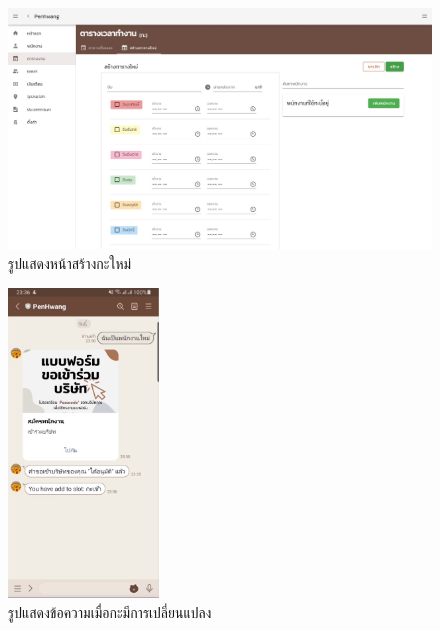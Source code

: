 \begin{figure}
  \begin{center}
    \includegraphics[width=14cm,keepaspectratio]{./images/new_slot.jpg}
  \end{center}
  \caption[รูปแสดงหน้าสร้างกะใหม่]{รูปแสดงหน้าสร้างกะใหม่} 
  \label{fig:new_slot}
\end{figure}
 
\begin{figure}
  \begin{center}
    \includegraphics[width=4cm,keepaspectratio]{./images/added_slot.jpg}
  \end{center}
  \caption[รูปแสดงข้อความเมื่อกะมีการเปลี่ยนแปลง]{รูปแสดงข้อความเมื่อกะมีการเปลี่ยนแปลง} 
  \label{fig:added_slot}
\end{figure}

